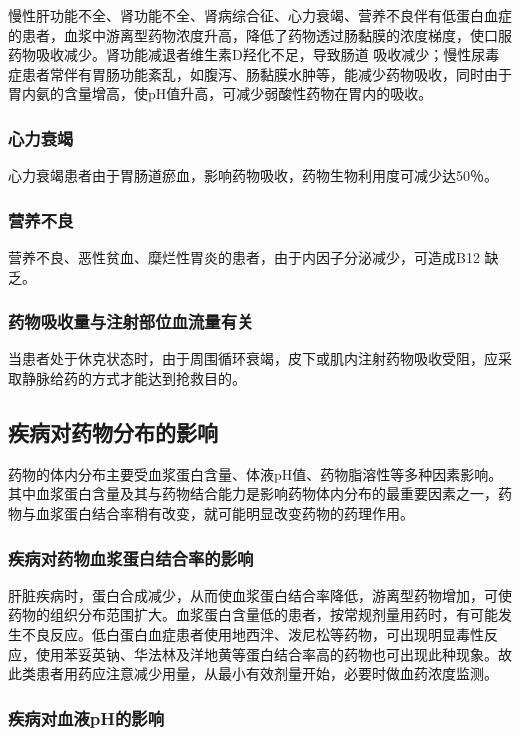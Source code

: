 慢性肝功能不全、肾功能不全、肾病综合征、心力衰竭、营养不良伴有低蛋白血症的患者，血浆中游离型药物浓度升高，降低了药物透过肠黏膜的浓度梯度，使口服药物吸收减少。肾功能减退者维生素D羟化不足，导致肠道
吸收减少；慢性尿毒症患者常伴有胃肠功能紊乱，如腹泻、肠黏膜水肿等，能减少药物吸收，同时由于胃内氨的含量增高，使pH值升高，可减少弱酸性药物在胃内的吸收。

\subsubsection{心力衰竭}

心力衰竭患者由于胃肠道瘀血，影响药物吸收，药物生物利用度可减少达50％。

\subsubsection{营养不良}

营养不良、恶性贫血、糜烂性胃炎的患者，由于内因子分泌减少，可造成B{12}
缺乏。

\subsubsection{药物吸收量与注射部位血流量有关}

当患者处于休克状态时，由于周围循环衰竭，皮下或肌内注射药物吸收受阻，应采取静脉给药的方式才能达到抢救目的。

\subsection{疾病对药物分布的影响}

药物的体内分布主要受血浆蛋白含量、体液pH值、药物脂溶性等多种因素影响。其中血浆蛋白含量及其与药物结合能力是影响药物体内分布的最重要因素之一，药物与血浆蛋白结合率稍有改变，就可能明显改变药物的药理作用。

\subsubsection{疾病对药物血浆蛋白结合率的影响}

肝脏疾病时，蛋白合成减少，从而使血浆蛋白结合率降低，游离型药物增加，可使药物的组织分布范围扩大。血浆蛋白含量低的患者，按常规剂量用药时，有可能发生不良反应。低白蛋白血症患者使用地西泮、泼尼松等药物，可出现明显毒性反应，使用苯妥英钠、华法林及洋地黄等蛋白结合率高的药物也可出现此种现象。故此类患者用药应注意减少用量，从最小有效剂量开始，必要时做血药浓度监测。

\subsubsection{疾病对血液pH的影响}

